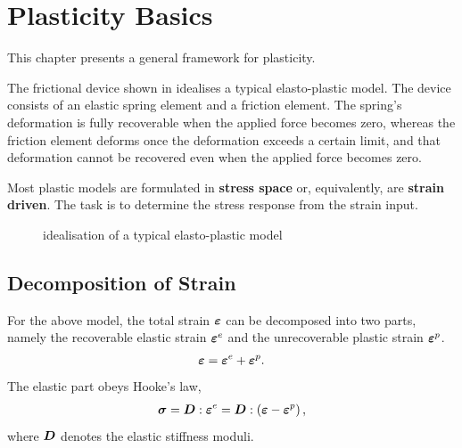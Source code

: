 \chapter{Plasticity Basics}
This chapter presents a general framework for plasticity.

The frictional device shown in  idealises a typical elasto-plastic model.
The device consists of an elastic spring element and a friction element.
The spring's deformation is fully recoverable when the applied force becomes zero, whereas the friction element deforms once the deformation exceeds a certain limit, and that deformation cannot be recovered even when the applied force becomes zero.

Most plastic models are formulated in \textbf{stress space} or, equivalently, are \textbf{strain driven}.
The task is to determine the stress response from the strain input.
\begin{figure}[ht]
\centering
{}
\caption{idealisation of a typical elasto-plastic model}\label{fig:idealisation}
\end{figure}
\section{Decomposition of Strain}
For the above model, the total strain $\bm{\varepsilon}$ can be decomposed into two parts, namely the recoverable elastic strain $\bm{\varepsilon}^e$ and the unrecoverable plastic strain $\bm{\varepsilon}^p$.
\begin{gather}
\bm{\varepsilon}=\bm{\varepsilon}^e+\bm{\varepsilon}^p.
\end{gather}
The elastic part obeys Hooke's law,
\begin{gather}\label{eq:strain_decomposition}
\bm{\sigma}=\bm{D}:\bm{\varepsilon}^e=\bm{D}:\left(\bm{\varepsilon}-\bm{\varepsilon}^p\right),
\end{gather}
where $\bm{D}$ denotes the elastic stiffness moduli.
